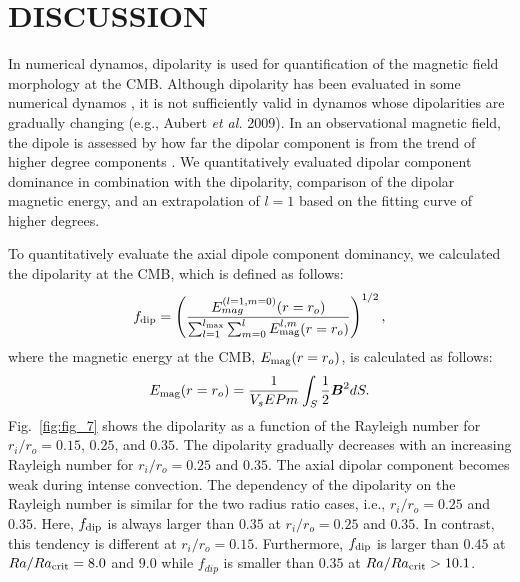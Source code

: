 \section{DISCUSSION}

In numerical dynamos, dipolarity is used for quantification of the magnetic field morphology at the CMB. 
Although dipolarity has been evaluated in some numerical dynamos \cite{Uli:2006,Soderlund:2012}, it is not sufficiently valid in dynamos whose dipolarities are gradually changing (e.g., Aubert {\it et al.} 2009). 
In an observational magnetic field, the dipole is assessed by how far the dipolar component is from the trend of higher degree components \cite{Lowes:1974,Langel:1982}. 
We quantitatively evaluated dipolar component dominance in combination with the dipolarity, comparison of the dipolar magnetic energy, and an extrapolation of $l = 1$ based on the fitting curve of higher degrees.

To quantitatively evaluate the axial dipole component dominancy, we calculated the dipolarity at the CMB, which is defined as follows:
%
\begin{equation}
f_{\rm dip} = 
\left(
\frac{E_{mag}^{(l=1,m=0)} (r=r_o)}
     {\sum_{l=1}^{l_{\rm max}}
      \sum_{m=0}^l E_{\rm mag}^{l,m} (r=r_o)}
\right)^{1/2},
\label{eq:f_dip}
\end{equation}
%
where the magnetic energy at the CMB, $E_{\rm mag} (r=r_o)$, is calculated as follows:
%
\begin{equation}
E_{\rm mag} (r=r_o) = 
  \frac{1}{V_s E Pm} \int_S \frac{1}{2} \mbox{\boldmath$B$}^2 dS.
\end{equation}
%
Fig.~\ref{fig:fig_7} shows the dipolarity as a function of the Rayleigh number for $r_i/r_o = 0.15$, $0.25$, and $0.35$. 
The dipolarity gradually decreases with an increasing Rayleigh number for $r_i/r_o = 0.25$ and $0.35$. 
The axial dipolar component becomes weak during intense convection. 
The dependency of the dipolarity on the Rayleigh number is similar for the two radius ratio cases, i.e., $r_i/r_o = 0.25$ and $0.35$. 
Here, $f_{\rm dip}$ is always larger than $0.35$ at $r_i/r_o = 0.25$ and $0.35$. 
In contrast, this tendency is different at $r_i/r_o = 0.15$. 
Furthermore, $f_{\rm dip}$ is larger than $0.45$ at $Ra/Ra_{\rm crit} = 8.0$ and $9.0$ while $f_{dip}$ is smaller than $0.35$ at $Ra/Ra_{\rm crit} > 10.1$.


